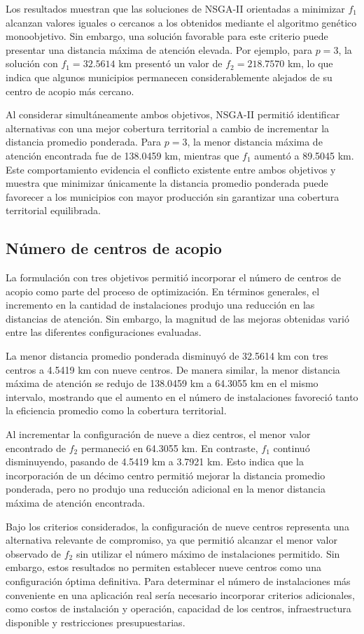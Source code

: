\documentclass[journal]{IEEEtran}
\begin{document}
Los resultados muestran que las soluciones de NSGA-II orientadas a minimizar $f_1$ alcanzan valores iguales o cercanos a los obtenidos mediante el algoritmo genético monoobjetivo. Sin embargo, una solución favorable para este criterio puede presentar una distancia máxima de atención elevada. Por ejemplo, para $p=3$, la solución con $f_1=32.5614$ km presentó un valor de $f_2=218.7570$ km, lo que indica que algunos municipios permanecen considerablemente alejados de su centro de acopio más cercano.

Al considerar simultáneamente ambos objetivos, NSGA-II permitió identificar alternativas con una mejor cobertura territorial a cambio de incrementar la distancia promedio ponderada. Para $p=3$, la menor distancia máxima de atención encontrada fue de 138.0459 km, mientras que $f_1$ aumentó a 89.5045 km. Este comportamiento evidencia el conflicto existente entre ambos objetivos y muestra que minimizar únicamente la distancia promedio ponderada puede favorecer a los municipios con mayor producción sin garantizar una cobertura territorial equilibrada.

\subsection{Número de centros de acopio}

La formulación con tres objetivos permitió incorporar el número de centros de acopio como parte del proceso de optimización. En términos generales, el incremento en la cantidad de instalaciones produjo una reducción en las distancias de atención. Sin embargo, la magnitud de las mejoras obtenidas varió entre las diferentes configuraciones evaluadas.

La menor distancia promedio ponderada disminuyó de 32.5614 km con tres centros a 4.5419 km con nueve centros. De manera similar, la menor distancia máxima de atención se redujo de 138.0459 km a 64.3055 km en el mismo intervalo, mostrando que el aumento en el número de instalaciones favoreció tanto la eficiencia promedio como la cobertura territorial.

Al incrementar la configuración de nueve a diez centros, el menor valor encontrado de $f_2$ permaneció en 64.3055 km. En contraste, $f_1$ continuó disminuyendo, pasando de 4.5419 km a 3.7921 km. Esto indica que la incorporación de un décimo centro permitió mejorar la distancia promedio ponderada, pero no produjo una reducción adicional en la menor distancia máxima de atención encontrada.

Bajo los criterios considerados, la configuración de nueve centros representa una alternativa relevante de compromiso, ya que permitió alcanzar el menor valor observado de $f_2$ sin utilizar el número máximo de instalaciones permitido. Sin embargo, estos resultados no permiten establecer nueve centros como una configuración óptima definitiva. Para determinar el número de instalaciones más conveniente en una aplicación real sería necesario incorporar criterios adicionales, como costos de instalación y operación, capacidad de los centros, infraestructura disponible y restricciones presupuestarias.
\end{document}
